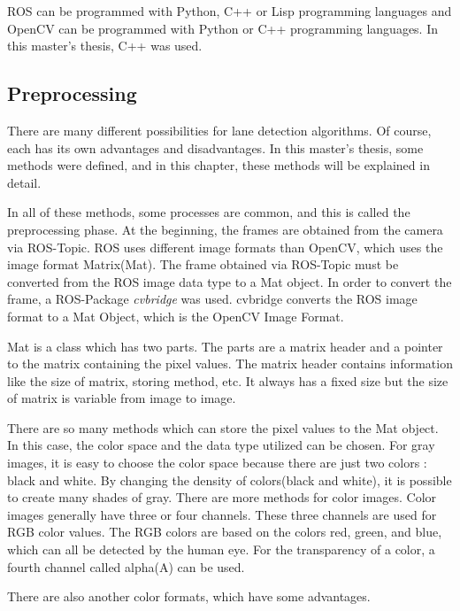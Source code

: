ROS can be programmed with Python, C++ or Lisp programming languages and OpenCV can be programmed with Python or C++ programming languages. In this master's thesis, C++ was used.

%
\subsection{Preprocessing}\label{sec:Preprocessing}

There are many different possibilities for lane detection algorithms. Of course, each has its own advantages and disadvantages. In this master's thesis, some methods were defined, and in this chapter, these methods will be explained in detail.

In all of these methods, some processes are common, and this is called the preprocessing phase. At the beginning, the frames are obtained from the camera via ROS-Topic. ROS uses different image formats than OpenCV, which uses the image format Matrix(Mat). The frame obtained via ROS-Topic must be converted from the ROS image data type to a Mat object. In order to convert the frame, a ROS-Package \textit{cvbridge}\cite{cv_bridge} was used. cvbridge converts the ROS image format to a Mat Object, which is the OpenCV Image Format. 

Mat is a class which has two parts. The parts are a matrix header and a pointer to the matrix containing the pixel values. The matrix header contains information like the size of matrix, storing method, etc. It always has a fixed size but the size of matrix is variable from image to image.

There are so many methods which can store the pixel values to the Mat object. In this case, the color space and the data type utilized can be chosen. For gray images, it is easy to choose the color space because there are just two colors : black and white. By changing the density of colors(black and white), it is possible to create many shades of gray. There are more methods for color images. Color images generally have three or four channels. These three channels are used for RGB color values. The RGB colors are based on the colors red, green, and blue, which can all be detected by the human eye. For the transparency of a color, a fourth channel called alpha(A) can be used.

There are also another color formats, which have some advantages\cite{OpenCV_Mat}. 

